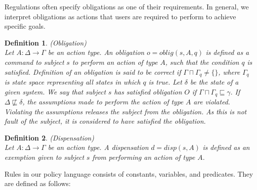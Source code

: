 \documentclass[12pt,journal,letterpaper,onecolumn]{IEEEtran}
\newtheorem{definition}{Definition}[section]
\begin{document}
Regulations often specify obligations as one of their requirements.
In general, we interpret obligations as actions that users are
required to perform to achieve specific goals. 
\begin{definition}(Obligation) \\
Let $A: \Delta \rightarrow \Gamma$ be an action type. An obligation
$o = oblig(s, A, q)$ is defined as a command to subject $s$ to
perform an action of type $A$, such that the condition $q$ is
satisfied. Definition of an obligation is said to be correct if
$\Gamma \sqcap \Gamma_q \neq \{\}$, where $\Gamma_q$ is state space
representing all states in which $q$ is true. Let $\delta$ be the
state of a given system. We say that subject $s$ has satisfied
obligation $O$ if $\Gamma \sqcap \Gamma_q \sqsubseteq \gamma$. If
$\Delta \not \sqsubseteq \delta$, the assumptions made to perform
the action of type $A$ are violated. Violating the assumptions
releases the subject from the obligation. As this is not fault of
the subject, it is considered to have satisfied the obligation.
 \label{def:obligation}
\end{definition}
\begin{definition}(Dispensation)\\
Let $A: \Delta \rightarrow \Gamma$ be an action type. A dispensation
$d = disp(s, A)$ is defined as an exemption given to subject $s$
from performing an action of type $A$.
 \label{def:dispensation}
\end{definition}

Rules in our policy language consists of constants, variables, and
predicates. They are defined as follows:
\end{document}
